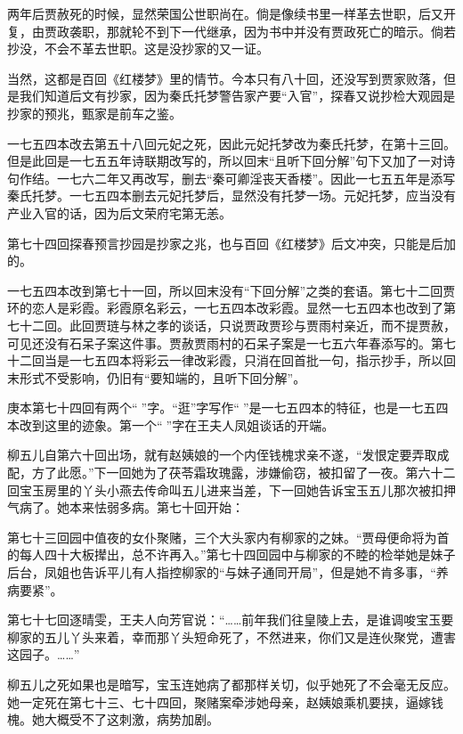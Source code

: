\par 两年后贾赦死的时候，显然荣国公世职尚在。倘是像续书里一样革去世职，后又开复，由贾政袭职，那就轮不到下一代继承，因为书中并没有贾政死亡的暗示。倘若抄没，不会不革去世职。这是没抄家的又一证。
\par 当然，这都是百回《红楼梦》里的情节。今本只有八十回，还没写到贾家败落，但是我们知道后文有抄家，因为秦氏托梦警告家产要“入官”，探春又说抄检大观园是抄家的预兆，甄家是前车之鉴。
\par 一七五四本改去第五十八回元妃之死，因此元妃托梦改为秦氏托梦，在第十三回。但是此回是一七五五年诗联期改写的，所以回末“且听下回分解”句下又加了一对诗句作结。一七六二年又再改写，删去“秦可卿淫丧天香楼”。因此一七五五年是添写秦氏托梦。一七五四本删去元妃托梦后，显然没有托梦一场。元妃托梦，应当没有产业入官的话，因为后文荣府宅第无恙。
\par 第七十四回探春预言抄园是抄家之兆，也与百回《红楼梦》后文冲突，只能是后加的。
\par 一七五四本改到第七十一回，所以回末没有“下回分解”之类的套语。第七十二回贾环的恋人是彩霞。彩霞原名彩云，一七五四本改彩霞。显然一七五四本也改到了第七十二回。此回贾琏与林之孝的谈话，只说贾政贾珍与贾雨村亲近，而不提贾赦，可见还没有石呆子案这件事。贾赦贾雨村的石呆子案是一七五六年春添写的。第七十二回当是一七五四本将彩云一律改彩霞，只消在回首批一句，指示抄手，所以回末形式不受影响，仍旧有“要知端的，且听下回分解”。
\par 庚本第七十四回有两个“𤞘”字。“逛”字写作“𤞘”是一七五四本的特征，也是一七五四本改到这里的迹象。第一个“𤞘”字在王夫人凤姐谈话的开端。
\par 柳五儿自第六十回出场，就有赵姨娘的一个内侄钱槐求亲不遂，“发恨定要弄取成配，方了此愿。”下一回她为了茯苓霜玫瑰露，涉嫌偷窃，被扣留了一夜。第六十二回宝玉房里的丫头小燕去传命叫五儿进来当差，下一回她告诉宝玉五儿那次被扣押气病了。她本来怯弱多病。第七十回开始：
\par 第七十三回园中值夜的女仆聚赌，三个大头家内有柳家的之妹。“贾母便命将为首的每人四十大板撵出，总不许再入。”第七十四回园中与柳家的不睦的检举她是妹子后台，凤姐也告诉平儿有人指控柳家的“与妹子通同开局”，但是她不肯多事，“养病要紧”。
\par 第七十七回逐晴雯，王夫人向芳官说：“……前年我们往皇陵上去，是谁调唆宝玉要柳家的五儿丫头来着，幸而那丫头短命死了，不然进来，你们又是连伙聚党，遭害这园子。……”
\par 柳五儿之死如果也是暗写，宝玉连她病了都那样关切，似乎她死了不会毫无反应。她一定死在第七十三、七十四回，聚赌案牵涉她母亲，赵姨娘乘机要挟，逼嫁钱槐。她大概受不了这刺激，病势加剧。
